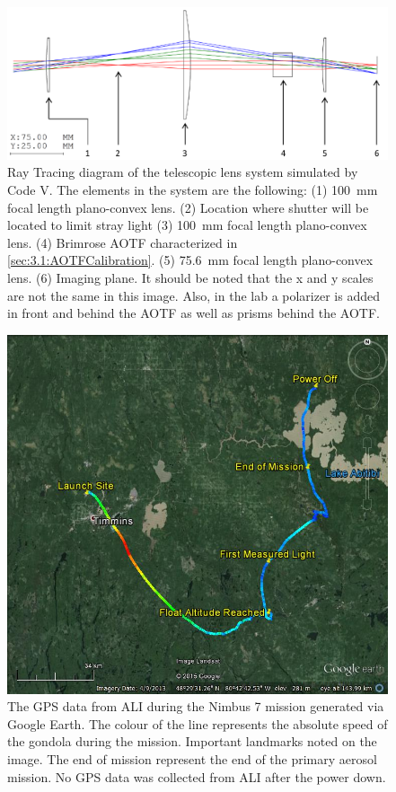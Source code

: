 \documentclass[12pt, draft]{article}
\begin{document}
\begin{figure}[h!]
    \includegraphics[width=1.0\textwidth]{./Images/3-2-TelescopicRayTracing.pdf}
    \caption[ALI Telescopic Design Prototype]{Ray Tracing diagram of the telescopic lens system simulated by Code V. The elements in the system are the following: (1) 100~mm focal length plano-convex lens. (2) Location where shutter will be located to limit stray light (3) 100~mm focal length plano-convex lens. (4) Brimrose AOTF characterized in \autoref{sec:3.1:AOTFCalibration}. (5) 75.6~mm focal length plano-convex lens. (6) Imaging plane. It should be noted that the x and y scales are not the same in this image. Also, in the lab a polarizer is added in front and behind the AOTF as well as prisms behind the AOTF.}
    \label{fig:3.2:telescopicRayTracing}
\end{figure}

\begin{figure}[h!]
    \includegraphics[width=1.0\textwidth]{./Images/5-1-AliGpsDataGoogleMaps.jpg}
    \caption[Flight Path of the Nimbus 7 Mission]{The GPS data from ALI during the Nimbus 7 mission generated via Google Earth. The colour of the line represents the absolute speed of the gondola during the mission. Important landmarks noted on the image. The end of mission represent the end of the primary aerosol mission. No GPS data was collected from ALI after the power down.}
    \label{fig:5.1:nimbus7FlightPath}
\end{figure}
\end{document}
